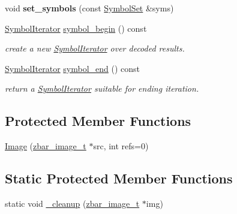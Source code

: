 \begin{DoxyCompactItemize}
\item 
\hypertarget{classzbar_1_1_image_afdd8b6593ab0c7f9b3c67d90677c4bc9}{
void {\bfseries set\_\-symbols} (const \hyperlink{classzbar_1_1_symbol_set}{SymbolSet} \&syms)}
\label{classzbar_1_1_image_afdd8b6593ab0c7f9b3c67d90677c4bc9}

\item 
\hypertarget{classzbar_1_1_image_a039d04b35cbc36c8651dfcb17d7a1b3d}{
\hyperlink{classzbar_1_1_image_1_1_symbol_iterator}{SymbolIterator} \hyperlink{classzbar_1_1_image_a039d04b35cbc36c8651dfcb17d7a1b3d}{symbol\_\-begin} () const }
\label{classzbar_1_1_image_a039d04b35cbc36c8651dfcb17d7a1b3d}

\begin{DoxyCompactList}\small\item\em create a new \hyperlink{classzbar_1_1_image_1_1_symbol_iterator}{SymbolIterator} over decoded results. \end{DoxyCompactList}\item 
\hypertarget{classzbar_1_1_image_a02fa926fe1358e8abc56fa65c75a50f2}{
\hyperlink{classzbar_1_1_image_1_1_symbol_iterator}{SymbolIterator} \hyperlink{classzbar_1_1_image_a02fa926fe1358e8abc56fa65c75a50f2}{symbol\_\-end} () const }
\label{classzbar_1_1_image_a02fa926fe1358e8abc56fa65c75a50f2}

\begin{DoxyCompactList}\small\item\em return a \hyperlink{classzbar_1_1_image_1_1_symbol_iterator}{SymbolIterator} suitable for ending iteration. \end{DoxyCompactList}\end{DoxyCompactItemize}
\subsection*{Protected Member Functions}
\begin{DoxyCompactItemize}
\item 
\hyperlink{classzbar_1_1_image_abf521e2197627e93b237afa8e7382c48}{Image} (\hyperlink{zbar_8h_a70d23bf7c2ee5e60fa0f19d4f66dc1bb}{zbar\_\-image\_\-t} $\ast$src, int refs=0)
\end{DoxyCompactItemize}
\subsection*{Static Protected Member Functions}
\begin{DoxyCompactItemize}
\item 
static void \hyperlink{classzbar_1_1_image_af7ff5ded01bb5f76556e845a5a2c745b}{\_\-cleanup} (\hyperlink{zbar_8h_a70d23bf7c2ee5e60fa0f19d4f66dc1bb}{zbar\_\-image\_\-t} $\ast$img)
\end{DoxyCompactItemize}
